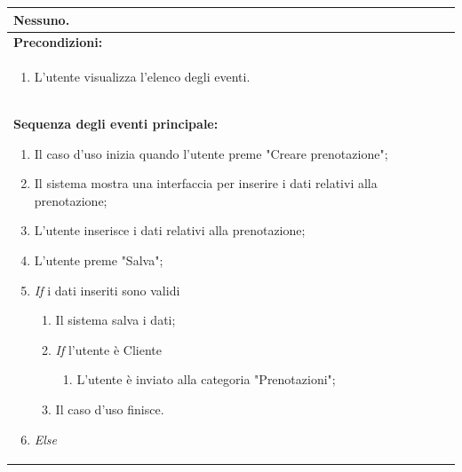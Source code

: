 \documentclass{article}
\begin{document}
\begin{table}[t]
\begin{tabular}{|p{\linewidth}|}
                        Nessuno. \\
                        \hline
                        \cellcolor{gray!20}
                        \textbf{Precondizioni:} \\
                        \cellcolor{gray!20}
                        \begin{minipage}{\linewidth}
                            \begin{enumerate}[noitemsep]
                                \item L'utente visualizza l'elenco degli eventi. %
                            \end{enumerate}
                        \end{minipage} \\
                        \hline
                        \textbf{Sequenza degli eventi principale:}
                        \begin{enumerate}
                            \item Il caso d'uso inizia quando l'utente preme "Creare prenotazione";
                            \item Il sistema mostra una interfaccia per inserire i dati relativi alla prenotazione;
                            \item L'utente inserisce i dati relativi alla prenotazione; 
                            \item L'utente preme "Salva";
                            \item \textit{If} i dati inseriti sono validi
                            \begin{enumerate}
                                \item Il sistema salva i dati;
                                \item \textit{If} l'utente è Cliente
                                \begin{enumerate}
                                    \item L'utente è inviato alla categoria "Prenotazioni";
                                \end{enumerate}
                                \item Il caso d'uso finisce.
                            \end{enumerate}
                            \item \textit{Else}
                            \begin{enumerate}

\end{enumerate}
\end{enumerate}
\end{tabular}
\end{table}
\end{document}

